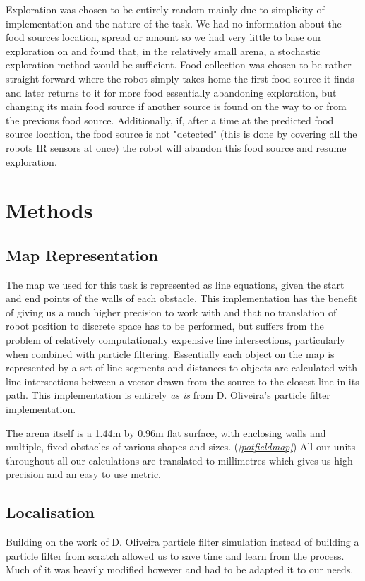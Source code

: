 \documentclass[paper=a4, fontsize=12pt]{scrartcl}	%
\numberwithin{equation}{section}		%
\numberwithin{figure}{section}			%
\numberwithin{table}{section}				%
\begin{document}
Exploration was chosen to be entirely random mainly due to simplicity of implementation and the nature of the task. We had no information about the food sources location, spread or amount so we had very little to base our exploration on and found that, in the relatively small arena, a stochastic exploration method would be sufficient. Food collection was chosen to be rather straight forward where the robot simply takes home the first food source it finds and later returns to it for more food essentially abandoning exploration, but changing its main food source if another source is found on the way to or from the previous food source. Additionally, if, after a time at the predicted food source location, the food source is not "detected" (this is done by covering all the robots IR sensors at once) the robot will abandon this food source and resume exploration.

\section{Methods} 
\subsection{Map Representation}
The map we used for this task is represented as line equations, given the start and end points of the walls of each obstacle. This implementation has the benefit of giving us a much higher precision to work with and that no translation of robot position to discrete space has to be performed, but suffers from the problem of relatively computationally expensive line intersections, particularly when combined with particle filtering. Essentially each object on the map is represented by a set of line segments and distances to objects are calculated with line intersections between a vector drawn from the source to the closest line in its path. This implementation is entirely \emph{as is} from D. Oliveira's particle filter implementation.\cite{oliveira}

The arena itself is a 1.44m by 0.96m flat surface, with enclosing walls and multiple, fixed obstacles of various shapes and sizes. (\emph{\ref{potfieldmap}}) All our units throughout all our calculations are translated to millimetres which gives us high precision and an easy to use metric.

\subsection{Localisation}
Building on the work of D. Oliveira particle filter simulation instead of building a particle filter from scratch allowed us to save time and learn from the process. Much of it was heavily modified however and had to be adapted it to our needs.
\end{document}
